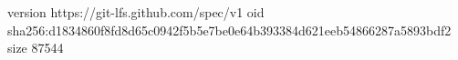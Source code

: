 version https://git-lfs.github.com/spec/v1
oid sha256:d1834860f8fd8d65c0942f5b5e7be0e64b393384d621eeb54866287a5893bdf2
size 87544
